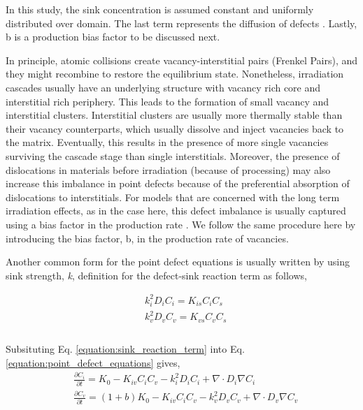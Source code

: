 \documentclass[utf8]{frontiersSCNS} %
\begin{document}
    In this study, the sink concentration is assumed constant and uniformly distributed over domain. The last term represents the  diffusion of defects \citep{motta2017,was2017}. Lastly, b is a production bias factor to be discussed next.
    
    In principle, atomic collisions create vacancy-interstitial pairs (Frenkel Pairs), and they might recombine to restore the equilibrium state. Nonetheless, irradiation cascades usually have an underlying structure with vacancy rich core and interstitial rich periphery. This leads to the formation of small vacancy and interstitial clusters. Interstitial clusters are usually more thermally stable than their vacancy counterparts, which usually dissolve and inject vacancies back to the matrix. Eventually, this results in the presence of more single vacancies surviving the cascade stage than single interstitials. Moreover, the presence of dislocations in materials before irradiation (because of processing) may also increase this imbalance in point defects because of the preferential absorption of dislocations to interstitials. For models that are concerned with the long term irradiation effects, as in the case here, this defect imbalance is usually captured using a bias factor in the production rate \citep{motta2017,was2017}. We follow the same procedure here by introducing the bias factor, b, in the production rate of vacancies.
    
    Another common form for the point defect equations is usually written by using sink strength, \textit{k},  definition for the defect-sink reaction term as follows,

    \begin{equation}
      \begin{aligned}
        &k_i^2D_iC_i = K_{is}C_iC_s \\
        &k_v^2D_vC_v = K_{vs}C_vC_s \\
      \end{aligned}
      \label{equation:sink_reaction_term}
    \end{equation}\\
    Subsituting Eq. \ref{equation:sink_reaction_term} into Eq. \ref{equation:point_defect_equations} gives,
    \begin{equation}
      \begin{aligned}
        &\frac{\partial C_i}{\partial t} = K_0 - K_{iv}C_iC_v - k_i^2D_iC_i + \nabla\cdot D_i\nabla C_i\\
        &\frac{\partial C_v}{\partial t} = (1+b)K_0 - K_{iv}C_iC_v - k_v^2D_vC_v + \nabla\cdot D_v\nabla C_v\\
      \end{aligned}
      \label{equation:point_defect_equations_sink_strength}
    \end{equation}
\end{document}
